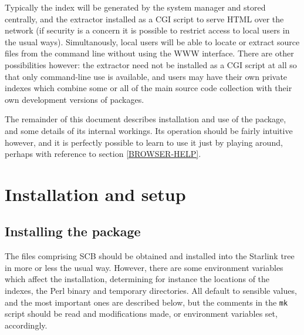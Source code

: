 \documentclass[twoside,11pt]{article}
\newcommand{\xlabel}[1]{}
\renewcommand{\_}{\texttt{\symbol{95}}}
\begin{document}
Typically the index
will be generated by the system manager and stored centrally,
and the extractor installed
as a CGI script to serve HTML over the network (if security is 
a concern it is possible to restrict access to local users in the
usual ways).  Simultanously, local users will be able to locate
or extract source files from the command line without using the 
WWW interface.  
There are other possibilities however: the extractor need not be
installed as a CGI script at all so that only command-line use
is available, and users may have their own private indexes 
which combine some or all of the main source code collection 
with their own development versions of packages.

The remainder of this document describes installation and use of
the package, and some details of its internal workings.
Its operation should be fairly intuitive however,
and it is perfectly possible to learn to use it just by playing around,
perhaps with reference to section \ref{BROWSER-HELP}.




\section{\xlabel{sec:install}\label{sec:install}Installation and setup}

\subsection{\xlabel{sec:install-pack}\label{sec:install-pack}Installing the package}

The files comprising SCB should be obtained and installed into
the Starlink tree in more or less the usual way.
However, there are some environment variables which affect the
installation, determining for instance the locations of the 
indexes, the Perl binary and temporary directories.  
All default to sensible values, and the most important ones
are described below, but the comments in the
{\tt mk} script should be read and modifications made,
or environment variables set, accordingly.
\end{document}

